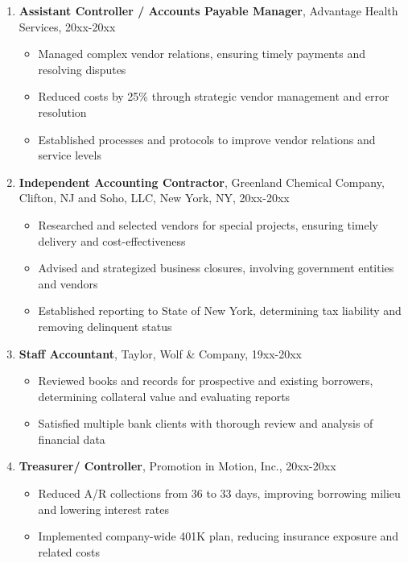 \documentclass[11pt]{article}
\begin{document}
\begin{enumerate}[leftmargin=*,labelwidth=1.5cm,labelsep=0.5cm,align=left]
\item \textbf{Assistant Controller / Accounts Payable Manager}, Advantage Health Services, 20xx-20xx
\begin{itemize}[leftmargin=*,labelsep=0.5cm]
\item Managed complex vendor relations, ensuring timely payments and resolving disputes
\item Reduced costs by 25\% through strategic vendor management and error resolution
\item Established processes and protocols to improve vendor relations and service levels
\end{itemize}

\item \textbf{Independent Accounting Contractor}, Greenland Chemical Company, Clifton, NJ and Soho, LLC, New York, NY, 20xx-20xx
\begin{itemize}[leftmargin=*,labelsep=0.5cm]
\item Researched and selected vendors for special projects, ensuring timely delivery and cost-effectiveness
\item Advised and strategized business closures, involving government entities and vendors
\item Established reporting to State of New York, determining tax liability and removing delinquent status
\end{itemize}

\item \textbf{Staff Accountant}, Taylor, Wolf \& Company, 19xx-20xx
\begin{itemize}[leftmargin=*,labelsep=0.5cm]
\item Reviewed books and records for prospective and existing borrowers, determining collateral value and evaluating reports
\item Satisfied multiple bank clients with thorough review and analysis of financial data
\end{itemize}

\item \textbf{Treasurer/ Controller}, Promotion in Motion, Inc., 20xx-20xx
\begin{itemize}[leftmargin=*,labelsep=0.5cm]
\item Reduced A/R collections from 36 to 33 days, improving borrowing milieu and lowering interest rates
\item Implemented company-wide 401K plan, reducing insurance exposure and related costs
\end{itemize}
\end{enumerate}
\end{document}
